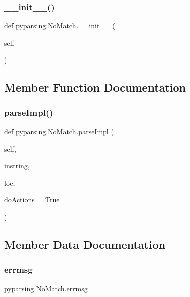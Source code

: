 \subsubsection{\texorpdfstring{\+\_\+\+\_\+init\+\_\+\+\_\+()}{\_\_init\_\_()}}
{\footnotesize\ttfamily def pyparsing.\+No\+Match.\+\_\+\+\_\+init\+\_\+\+\_\+ (\begin{DoxyParamCaption}\item[{}]{self }\end{DoxyParamCaption})}



\subsection{Member Function Documentation}
\mbox{\label{classpyparsing_1_1NoMatch_ab56fd353c47e28b8f25be126d036c2aa}} 
\subsubsection{\texorpdfstring{parse\+Impl()}{parseImpl()}}
{\footnotesize\ttfamily def pyparsing.\+No\+Match.\+parse\+Impl (\begin{DoxyParamCaption}\item[{}]{self,  }\item[{}]{instring,  }\item[{}]{loc,  }\item[{}]{do\+Actions = {\ttfamily True} }\end{DoxyParamCaption})}



\subsection{Member Data Documentation}
\mbox{\label{classpyparsing_1_1NoMatch_a483e8a74afe217dc9e669337f77d02af}} 
\subsubsection{\texorpdfstring{errmsg}{errmsg}}
{\footnotesize\ttfamily pyparsing.\+No\+Match.\+errmsg}

